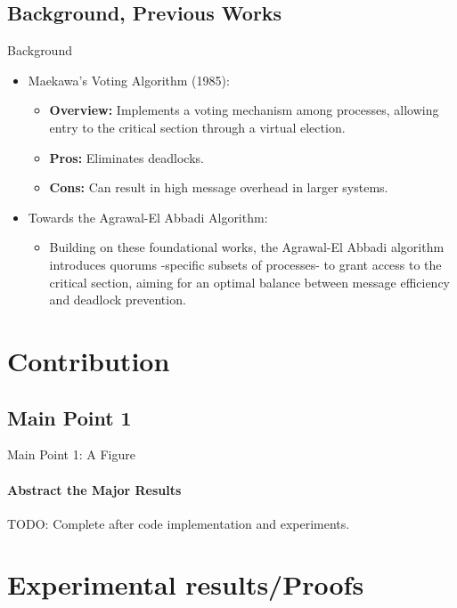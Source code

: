 \documentclass[11pt]{beamer}              %
\begin{document}
\subsection{Background, Previous Works}
\begin{frame}{Background}

  \begin{itemize}
    \item Maekawa's Voting Algorithm (1985):
      \begin{itemize}
        \item \textbf{Overview:} Implements a voting mechanism among processes, allowing entry to the critical section through a virtual election.
        \item \textbf{Pros:} Eliminates deadlocks.
        \item \textbf{Cons:} Can result in high message overhead in larger systems.
      \end{itemize}
    
    \item Towards the Agrawal-El Abbadi Algorithm:
      \begin{itemize}
        \item Building on these foundational works, the Agrawal-El Abbadi algorithm introduces quorums -specific subsets of processes- to grant access to the critical section, aiming for an optimal balance between message efficiency and deadlock prevention.
      \end{itemize}
  \end{itemize}
\end{frame}



\section{Contribution}
\subsection{Main Point 1}
\begin{frame}{Main Point 1: A Figure}
\framesubtitle{Abstract the Major Results}

TODO: Complete after code implementation and experiments.

\end{frame}


\section{Experimental results/Proofs}
\end{document}
